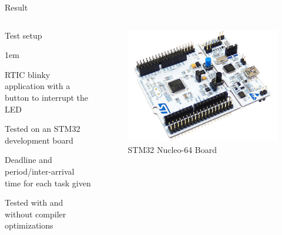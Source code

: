 \begin{frame}{Result}
    \begin{columns}
        \begin{block}{Test setup}
            \begin{itemize-size}{1em}
                \item RTIC blinky application with a button to interrupt the LED
                \item Tested on an STM32 development board
                \item Deadline and period/inter-arrival time for each
                task given
                \item Tested with and without compiler optimizations
            \end{itemize-size}
        \end{block}

        \begin{figure}
            \centering
            \includegraphics[scale=1.5]{pictures/stm32.jpg}
            \caption*{STM32 Nucleo-64 Board}
        \end{figure}
    \end{columns}
\end{frame}

